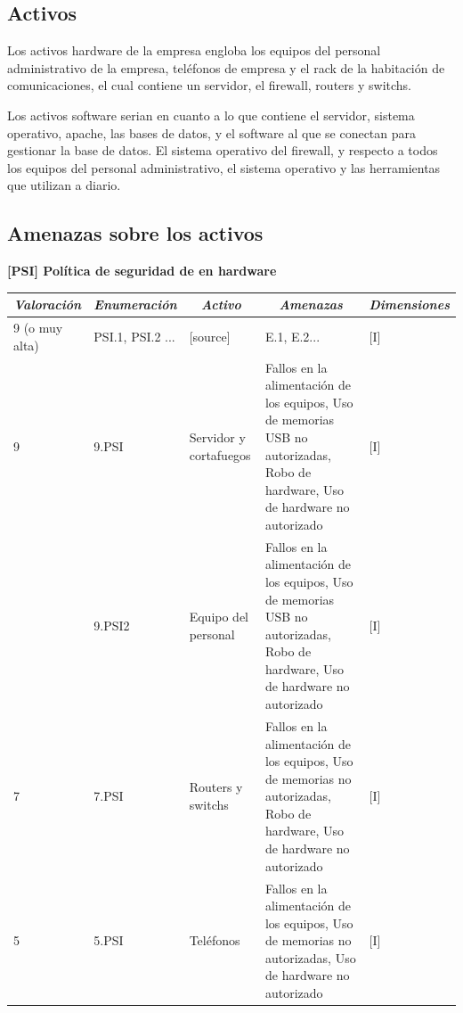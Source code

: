 \documentclass[11pt,bibtotoc,noliststotoc,BCOR0mm]{scrbook}
\newcommand{\cellcenter}[1]{\multicolumn{1}{c}{#1}}
\newcommand{\thead}[1]{\textbf{\emph{#1}}}
\begin{document}
\subsection{Activos}

Los activos hardware de  la empresa engloba los equipos del personal administrativo de la empresa, teléfonos de empresa y el rack de la habitación de comunicaciones, el cual contiene un servidor, el firewall, routers y switchs. 


Los activos software serian en cuanto a lo que contiene el servidor, sistema operativo, apache, las bases de datos, y el software al que se conectan para gestionar la base de datos. El sistema operativo del firewall, y respecto a todos los equipos del personal administrativo, el sistema operativo y las herramientas que utilizan a diario.


\subsection{Amenazas sobre los activos}


\begin{center}
  \centering
  \textbf{[PSI] Política de seguridad de en hardware}
  \begin{tabular}{|m{}|m{}|m{}|m{}|m{}|}
    \cellcenter{\thead{Valoración}} & \cellcenter{\thead{Enumeración}} & \cellcenter{\thead{Activo}} 
& \cellcenter{\thead{Amenazas}} & \cellcenter{\thead{Dimensiones}} \\ \hline
    9 (o muy alta) & PSI.1, PSI.2 ... & [source] & E.1, E.2... & [I] \\ \hline
    9 & 9.PSI & Servidor y cortafuegos & Fallos en la alimentación de los equipos, Uso de memorias USB no autorizadas, Robo de hardware, Uso de hardware no autorizado  & [I] \\ \hline
      & 9.PSI2 & Equipo del personal & Fallos en la alimentación de los equipos, Uso de memorias USB no autorizadas, Robo de hardware, Uso de hardware no autorizado  & [I] \\ \hline
    7 & 7.PSI & Routers y switchs & Fallos en la alimentación de los equipos, Uso de memorias no autorizadas, Robo de hardware, Uso de hardware no autorizado  & [I] \\ \hline
    5 & 5.PSI & Teléfonos & Fallos en la alimentación de los equipos, Uso de memorias no autorizadas, Uso de hardware no autorizado  & [I] \\ \hline
  \end{tabular}
\end{center}
\end{document}
